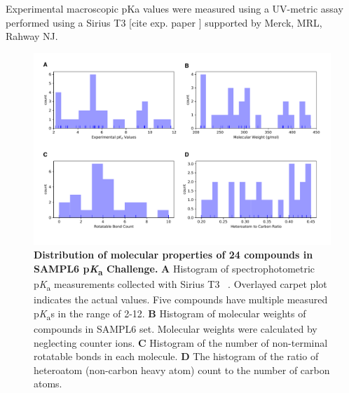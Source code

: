 \documentclass[9pt,lineno,final]{elife}
\newcommand{\pKa}{p\textit{K}\textsubscript{a}}
\begin{document}




Experimental macroscopic pKa values were measured using a UV-metric assay performed using a Sirius T3 [cite exp. paper ]  supported by Merck, MRL,  Rahway NJ.  

\begin{figure}
\begin{center}
\includegraphics[width=1.0\linewidth]{figures/distribution_of_molecular_properties.pdf}
\caption{{\bf Distribution of molecular properties of 24 compounds in SAMPL6 \pKa{} Challenge.} {\bf A} Histogram of spectrophotometric \pKa{} measurements collected with Sirius T3 ~\cite{Isik:2018:J.Comput.AidedMol.Des.}. Overlayed carpet plot indicates the actual values. Five compounds have multiple measured \pKa{}s in the range of 2-12. {\bf B} Histogram of molecular weights of compounds in SAMPL6 set. Molecular weights were calculated by neglecting counter ions. {\bf C} Histogram of the number of non-terminal rotatable bonds in each molecule. {\bf D} The histogram of the ratio of heteroatom (non-carbon heavy atom) count to the number of carbon atoms.
}
\label{fig:dist_mol_prop}
\end{center}
\end{figure}
\end{document}

